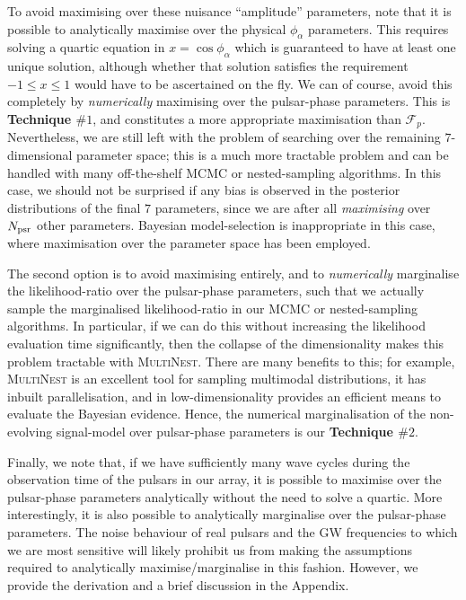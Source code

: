 \documentclass[prd,showpacs,nofootinbib]{revtex4}
\begin{document}
To avoid maximising over these nuisance ``amplitude'' parameters, \citet{ellis_optimal} note that it is possible to analytically maximise over the physical $\phi_{\alpha}$ parameters. This requires solving a quartic equation in $x=\cos\phi_{\alpha}$ which is guaranteed to have at least one unique solution, although whether that solution satisfies the requirement $-1 \leq x \leq 1$ would have to be ascertained on the fly. We can of course, avoid this completely by \textit{numerically} maximising over the pulsar-phase parameters. This is {\bf Technique $\#1$}, and constitutes a more appropriate maximisation than $\mathcal{F}_p$. Nevertheless, we are still left with the problem of searching over the remaining $7$-dimensional parameter space; this is a much more tractable problem and can be handled with many off-the-shelf MCMC or nested-sampling algorithms. In this case, we should not be surprised if any bias is observed in the posterior distributions of the final $7$ parameters, since we are after all \textit{maximising} over $N_{\rm psr}$ other parameters. Bayesian model-selection is inappropriate in this case, where maximisation over the parameter space has been employed.

The second option is to avoid maximising entirely, and to \textit{numerically} marginalise the likelihood-ratio over the pulsar-phase parameters, such that we actually sample the marginalised likelihood-ratio in our MCMC or nested-sampling algorithms. In particular, if we can do this without increasing the likelihood evaluation time significantly, then the collapse of the dimensionality makes this problem tractable with \textsc{MultiNest}. There are many benefits to this; for example, \textsc{MultiNest} is an excellent tool for sampling multimodal distributions, it has inbuilt parallelisation, and in low-dimensionality provides an efficient means to evaluate the Bayesian evidence. Hence, the numerical marginalisation of the non-evolving signal-model over pulsar-phase parameters is our {\bf Technique $\#2$}.

Finally, we note that, if we have sufficiently many wave cycles during the observation time of the pulsars in our array, it is possible to maximise over the pulsar-phase parameters analytically without the need to solve a quartic. More interestingly, it is also possible to analytically marginalise over the pulsar-phase parameters. The noise behaviour of real pulsars and the GW frequencies to which we are most sensitive will likely prohibit us from making the assumptions required to analytically maximise/marginalise in this fashion. However, we provide the derivation and a brief discussion in the Appendix.
\end{document}
